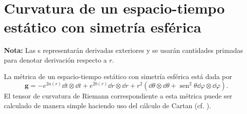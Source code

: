 \chapter{Curvatura de un espacio-tiempo estático con simetría esférica}\label{curvature}

\noindent \small \textbf{Nota:} Las \quotes{$\dd$}s representarán derivadas exteriores y se usarán cantidades primadas para denotar derivación respecto a $r$.

\normalsize
\noindent La métrica de un espacio-tiempo estático con simetría esférica está dada por
\begin{equation}
    \bm{g}=-e^{2 a(r)} \dd{t} \otimes \dd{t}+e^{2 b(r)} \dd{r} \otimes \dd{r} +r^{2}\left(\dd{\theta} \otimes \dd{\theta}+\operatorname{sen}^{2} \theta \dd{\varphi} \otimes \dd{\varphi}\right).
\end{equation}
El tensor de curvatura de Riemann correspondiente a esta métrica puede ser calculado de manera simple haciendo uso del cálculo de Cartan (cf. \cite{Chandrasekhar1983,Straumann2013}). 


